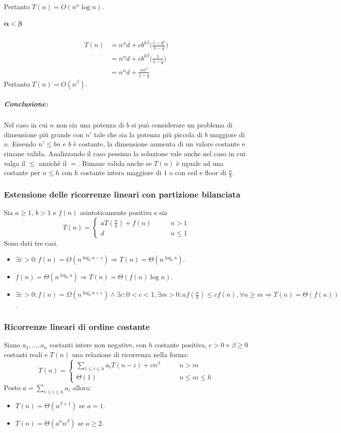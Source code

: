 Pertanto $T(n) = O(n^\alpha\log n)$.
\subparagraph{$\mathbf{\alpha<\beta}$}
\begin{align*}
	T(n) &= n^\alpha d + cb^{k\beta}\biggl(\frac{1-q^k}{1-q}\biggr)\\
	     &= n^\alpha d + cb^{k\beta}\biggl(\frac{1}{1-q}\biggr)\\
	     &=n^\alpha d + \frac{cn^\beta}{1-q}
\end{align*}
Pertanto $T(n) = O(n^\beta)$.
\subparagraph{Conclusione:} Nel caso in cui $n$ non sia una potenza di $b$ si pu\`o considerare un problema di dimensione pi\`u grande con $n'$ tale che sia la potenza pi\`u piccola di 
$b$ maggiore di $n$. Essendo $n'\le bn$ e $b$ \`e costante, la dimensione aumenta di un valore costante e rimane valida. Analizzando il caso pessimo la soluzione vale anche nel caso
in cui valga il $\le$ anzich\`e il $=$. Rimane valida anche se $T(n)$ \`e uguale ad una costante per $n\le h$ con $h$ costante intera maggiore di $1$ o con ceil e floor di $\frac{n}{b}$.
\subsubsection{Estensione delle ricorrenze lineari con partizione bilanciata}
Sia $a\ge 1$, $b>1$ e $f(n)$ asintoticamente positiva e sia 
\begin{equation*}
T(n)=
\begin{cases}
aT(\frac{n}{b})+f(n)\quad\quad & n>1\\
d & n\le 1
\end{cases}
\end{equation*}
Sono dati tre casi.
\begin{itemize}
\item $\exists \varepsilon >0: f(n)=O(n^{\log_ba-\varepsilon})\Rightarrow T(n)=\Theta(n^{\log_ba})$.
\item $f(n)=\Theta(n^{\log_ba})\Rightarrow T(n)=\Theta(f(n)\log n)$.
\item $\exists\varepsilon>0:f(n)=\Omega(n^{\log_ba+\varepsilon})\land \exists c:0<c<1, \exists m>0:af(\frac{n}{b})\le cf(n),\forall n\ge m\Rightarrow T(n)=
\Theta(f(n))$.
\end{itemize}
\subsubsection{Ricorrenze lineari di ordine costante}
Siano $a_1,\dots,a_n$ costanti intere non negative, con $h$ costante positiva, $c>0$ e $\beta\ge 0$ costanti reali e $T(n)$ una relazione di ricorrenza 
nella forma:
\begin{equation*}
T(n)=
\begin{cases}
\sum\limits_{1\le i\le h}a_iT(n-i)+cn^\beta\quad\quad& n>m\\
\Theta(1) & n\le m\le h
\end{cases}
\end{equation*}
Posto $a=\sum\limits_{1\le i\le h}a_i$ allora:
\begin{itemize}
\item $T(n)=\Theta(n^{\beta+1})$ se $a=1$.
\item $T(n)=\Theta(a^nn^{\beta})$ se $a\ge 2$.
\end{itemize}




